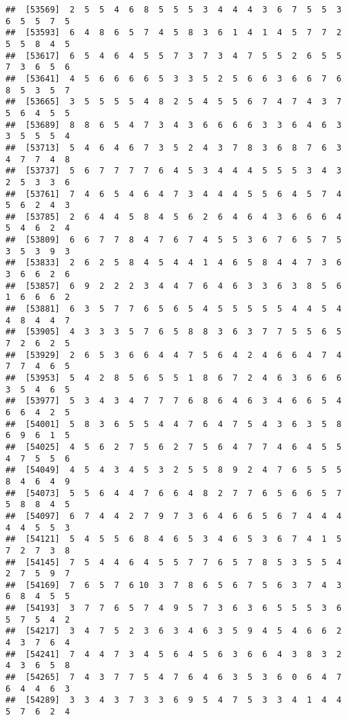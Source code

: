 \documentclass[
]{book}
\begin{document}
\begin{verbatim}
##  [53569]  2  5  5  4  6  8  5  5  5  3  4  4  4  3  6  7  5  5  3  6  5  5  7  5
##  [53593]  6  4  8  6  5  7  4  5  8  3  6  1  4  1  4  5  7  7  2  5  5  8  4  5
##  [53617]  6  5  4  6  4  5  5  7  3  7  3  4  7  5  5  2  6  5  5  7  3  6  5  6
##  [53641]  4  5  6  6  6  6  5  3  3  5  2  5  6  6  3  6  6  7  6  8  5  3  5  7
##  [53665]  3  5  5  5  5  4  8  2  5  4  5  5  6  7  4  7  4  3  7  5  6  4  5  5
##  [53689]  8  8  6  5  4  7  3  4  3  6  6  6  6  3  3  6  4  6  3  3  5  5  5  4
##  [53713]  5  4  6  4  6  7  3  5  2  4  3  7  8  3  6  8  7  6  3  4  7  7  4  8
##  [53737]  5  6  7  7  7  7  6  4  5  3  4  4  4  5  5  5  3  4  3  2  5  3  3  6
##  [53761]  7  4  6  5  4  6  4  7  3  4  4  4  5  5  6  4  5  7  4  5  6  2  4  3
##  [53785]  2  6  4  4  5  8  4  5  6  2  6  4  6  4  3  6  6  6  4  5  4  6  2  4
##  [53809]  6  6  7  7  8  4  7  6  7  4  5  5  3  6  7  6  5  7  5  3  5  3  9  3
##  [53833]  2  6  2  5  8  4  5  4  4  1  4  6  5  8  4  4  7  3  6  3  6  6  2  6
##  [53857]  6  9  2  2  2  3  4  4  7  6  4  6  3  3  6  3  8  5  6  1  6  6  6  2
##  [53881]  6  3  5  7  7  6  5  6  5  4  5  5  5  5  5  4  4  5  4  4  8  4  4  7
##  [53905]  4  3  3  3  5  7  6  5  8  8  3  6  3  7  7  5  5  6  5  7  2  6  2  5
##  [53929]  2  6  5  3  6  6  4  4  7  5  6  4  2  4  6  6  4  7  4  7  7  4  6  5
##  [53953]  5  4  2  8  5  6  5  5  1  8  6  7  2  4  6  3  6  6  6  3  5  4  6  5
##  [53977]  5  3  4  3  4  7  7  7  6  8  6  4  6  3  4  6  6  5  4  6  6  4  2  5
##  [54001]  5  8  3  6  5  5  4  4  7  6  4  7  5  4  3  6  3  5  8  6  9  6  1  5
##  [54025]  4  5  6  2  7  5  6  2  7  5  6  4  7  7  4  6  4  5  5  4  7  5  5  6
##  [54049]  4  5  4  3  4  5  3  2  5  5  8  9  2  4  7  6  5  5  5  8  4  6  4  9
##  [54073]  5  5  6  4  4  7  6  6  4  8  2  7  7  6  5  6  6  5  7  5  8  8  4  5
##  [54097]  6  7  4  4  2  7  9  7  3  6  4  6  6  5  6  7  4  4  4  4  4  5  5  3
##  [54121]  5  4  5  5  6  8  4  6  5  3  4  6  5  3  6  7  4  1  5  7  2  7  3  8
##  [54145]  7  5  4  4  6  4  5  5  7  7  6  5  7  8  5  3  5  5  4  2  7  5  9  7
##  [54169]  7  6  5  7  6 10  3  7  8  6  5  6  7  5  6  3  7  4  3  6  8  4  5  5
##  [54193]  3  7  7  6  5  7  4  9  5  7  3  6  3  6  5  5  5  3  6  5  7  5  4  2
##  [54217]  3  4  7  5  2  3  6  3  4  6  3  5  9  4  5  4  6  6  2  4  3  7  6  4
##  [54241]  7  4  4  7  3  4  5  6  4  5  6  3  6  6  4  3  8  3  2  4  3  6  5  8
##  [54265]  7  4  3  7  7  5  4  7  6  4  6  3  5  3  6  0  6  4  7  6  4  4  6  3
##  [54289]  3  3  4  3  7  3  3  6  9  5  4  7  5  3  3  4  1  4  4  5  7  6  2  4

\end{verbatim}
\end{document}
